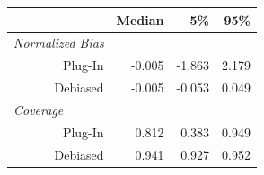 
\begin{tabular}{r|rrr}
\toprule
  & Median & 5\% & 95\%\\
\midrule
\multicolumn{1}{l|}{\textit{Normalized Bias}}\\
Plug-In & -0.005 & -1.863 & 2.179\\
Debiased & -0.005 & -0.053 & 0.049\\
\midrule
\multicolumn{1}{l|}{\textit{Coverage}}\\
Plug-In & 0.812 & 0.383 & 0.949\\
Debiased & 0.941 & 0.927 & 0.952\\
\bottomrule
\end{tabular}
